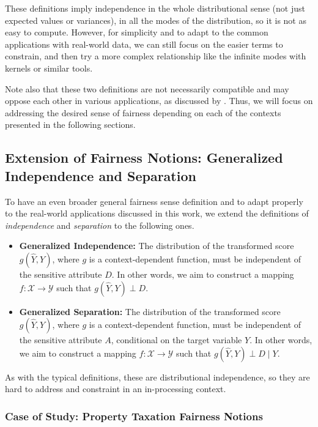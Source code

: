 \documentclass[11pt]{article}
\theoremstyle{plain}
\theoremstyle{definition}
\newcommand{\1}{\mathbf{1}}
\newcommand{\Y}{\mathcal{Y}}
\newcommand{\X}{\mathcal{X}}
\begin{document}
These definitions imply independence in the whole distributional sense (not just expected values or variances), in all the modes of the distribution, so it is not as easy to compute. However, for simplicity and to adapt to the common applications with real-world data, we can still focus on the easier terms to constrain, and then try a more complex relationship like the infinite modes with kernels or similar tools.

Note also that these two definitions are not necessarily compatible and may oppose each other in various applications, as discussed by \cite{lee2020maximalcorrelationapproachimposing}. Thus, we will focus on addressing the desired sense of fairness depending on each of the contexts presented in the following sections. 

\subsection{Extension of Fairness Notions: Generalized Independence and Separation}
To have an even broader general fairness sense definition and to adapt properly to the real-world applications discussed in this work, we extend the definitions of \textit{independence} and \textit{separation} to the following ones. 

\begin{itemize}
    \item \textbf{Generalized Independence:} The distribution of the transformed score $g(\hat{Y}, Y)$, where $g$ is a context-dependent function, must be independent of the sensitive attribute $D$. In other words, we aim to construct a mapping $f:\X\rightarrow \Y$ such that $g(\hat{Y}, Y) \perp D$.

    \item \textbf{Generalized Separation:} The distribution of the transformed score $g(\hat{Y}, Y)$, where $g$ is a context-dependent function, must be independent of the sensitive attribute $A$, conditional on the target variable $Y$. In other words, we aim to construct a mapping $f:\X\rightarrow \Y$ such that $g(\hat{Y}, Y) \perp D \;|\; Y$.
\end{itemize}

As with the typical definitions, these are distributional independence, so they are hard to address and constraint in an in-processing context. 

\subsubsection{Case of Study: Property Taxation Fairness Notions}
\end{document}
